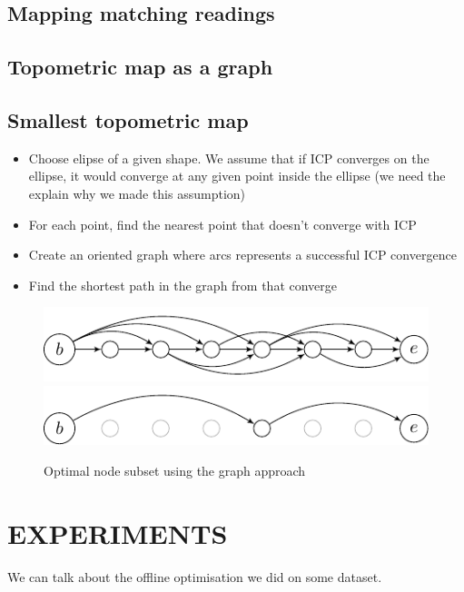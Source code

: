\documentclass[letterpaper,10 pt,conference]{ieeeconf}
\begin{document}
\subsection{Mapping matching readings}

\subsection{Topometric map as a graph}

\subsection{Smallest topometric map}

\begin{itemize}
  \item Choose elipse of a given shape. We assume that if ICP converges on the
    ellipse, it would converge at any given point inside the ellipse (we need the explain why we made this assumption)

  \item For each point, find the nearest point that doesn't converge with ICP

  \item Create an oriented graph where arcs represents a successful ICP convergence

  \item Find the shortest path in the graph from that converge

\end{itemize}

\begin{figure}[thpb]
  \centering
  \includegraphics[scale=1.0]{unoptimized-graph}
  \includegraphics[scale=1.0]{optimized-graph}
  \caption{Optimal node subset using the graph approach}
\end{figure}


\section{EXPERIMENTS}
We can talk about the offline optimisation we did on some dataset.
\end{document}
